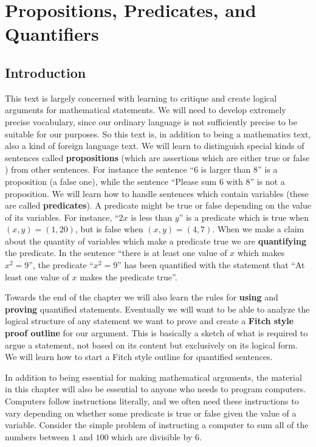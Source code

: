 \chapter{Propositions, Predicates, and Quantifiers}

\section{Introduction}

This text is largely concerned with learning to critique and create logical arguments for mathematical statements.  We will need to develop extremely precise vocabulary, since our ordinary language is not sufficiently precise to be suitable for our purposes.  So this text is, in addition to being a mathematics text, also a kind of foreign language text.  We will learn to distinguish special kinds of sentences called \textbf{propositions} (which are assertions which are either true or false ) from other sentences.  For instance the sentence ``6 is larger than 8'' is a proposition (a false one), while the sentence ``Please sum 6 with 8'' is not a proposition.   We will learn how to handle sentences which contain variables (these are called \textbf{predicates}).  A predicate might be true or false depending on the value of its variables.  For instance, ``$2x$  is less than $y$'' is a predicate which is true when $(x,y) = (1,20)$, but is false when $(x,y) = (4,7)$.  When we make a claim about the quantity of variables which make a predicate true we are \textbf{quantifying} the predicate.  In the sentence ``there is at least one value of $x$ which makes $x^2  = 9$'', the predicate ``$x^2 =9$'' has been quantified with the statement that ``At least one value of $x$ makes the predicate true''.  

Towards the end of the chapter we will also learn the rules for \textbf{using} and \textbf{proving} quantified statements.  Eventually we will want to be able to analyze the logical structure of any statement we want to prove and create a \textbf{Fitch style proof outline} for our argument.  This is basically a sketch of what is required to argue a statement, not based on its content but exclusively on its logical form.  We will learn how to start a Fitch style outline for quantified sentences.

In addition to being essential for making mathematical arguments, the material in this chapter will also be essential to anyone who needs to program computers.  Computers follow instructions literally, and we often need these instructions to vary depending on whether some predicate is true or false given the value of a variable.  Consider the simple problem of instructing a computer to sum all of the numbers between $1$ and $100$ which are divisible by $6$.

